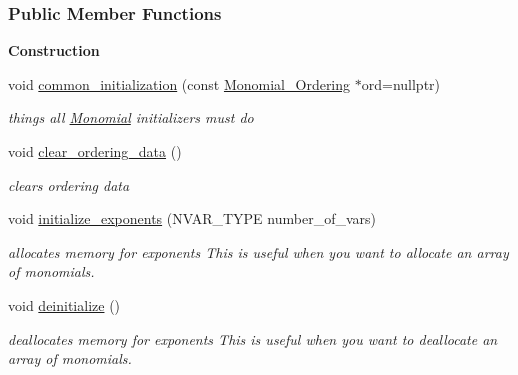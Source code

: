 \subsubsection*{Public Member Functions}
\begin{Indent}\textbf{ Construction}\par
\begin{DoxyCompactItemize}
\item 
\mbox{\label{group__polygroup_a7d50554f29ff84177270316088772397}} 
void \hyperlink{group__polygroup_a7d50554f29ff84177270316088772397}{common\+\_\+initialization} (const \hyperlink{group__orderinggroup_class_monomial___ordering}{Monomial\+\_\+\+Ordering} $\ast$ord=nullptr)
\begin{DoxyCompactList}\small\item\em things all {\ttfamily \hyperlink{group__polygroup_class_monomial}{Monomial}} initializers must do \end{DoxyCompactList}\item 
\mbox{\label{group__polygroup_a1f26973f28728c3da599f42afccb29bc}} 
void \hyperlink{group__polygroup_a1f26973f28728c3da599f42afccb29bc}{clear\+\_\+ordering\+\_\+data} ()
\begin{DoxyCompactList}\small\item\em clears ordering data \end{DoxyCompactList}\item 
\mbox{\label{group__polygroup_a1103a9a7e8d60147a1e00a1bd23bfea3}} 
void \hyperlink{group__polygroup_a1103a9a7e8d60147a1e00a1bd23bfea3}{initialize\+\_\+exponents} (N\+V\+A\+R\+\_\+\+T\+Y\+PE number\+\_\+of\+\_\+vars)
\begin{DoxyCompactList}\small\item\em allocates memory for exponents This is useful when you want to allocate an array of monomials. \end{DoxyCompactList}\item 
\mbox{\label{group__polygroup_a471eab4cf0ce40225a1b8210513ad9e4}} 
void \hyperlink{group__polygroup_a471eab4cf0ce40225a1b8210513ad9e4}{deinitialize} ()
\begin{DoxyCompactList}\small\item\em deallocates memory for exponents This is useful when you want to deallocate an array of monomials. \end{DoxyCompactList}\item 

\end{DoxyCompactItemize}
\end{Indent}
